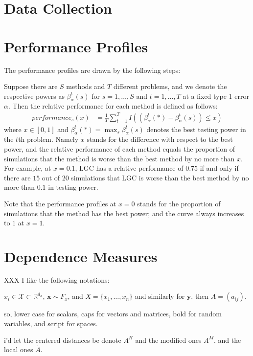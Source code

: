 \documentclass[11pt]{article}
\providecommand{\mt}[1]{\widetilde{#1}}
\providecommand{\mb}[1]{\boldsymbol{#1}}
\providecommand{\mc}[1]{\mathcal{#1}}
\newcommand{\Real}{\mathbb{R}}
\begin{document}
\section{Data Collection}



\section{Performance Profiles}

The performance profiles are drawn by the following steps:

Suppose there are $S$ methods and $T$ different problems, and we denote the respective powers as $\beta_{\alpha}^{t}(s)$ for $s=1,\ldots,S$ and $t=1,\ldots,T$ at a fixed type 1 error $\alpha$. Then the relative performance for each method is defined as follows:
\begin{align*}
performance_{s}(x) &= \frac{1}{T} \sum_{t=1}^{T} I((\beta_{\alpha}^{t}(*)-\beta_{\alpha}^{t}(s)) \leq x)
\end{align*}
where $x \in [0,1]$ and $\beta_{\alpha}^{t}(*) =\max_{s} \beta_{\alpha}^{t}(s)$ denotes the best testing power in the $t$th problem. Namely $x$ stands for the difference with respect to the best power, and the relative performance of each method equals the proportion of simulations that the method is worse than the best method by no more than $x$. For example, at $x=0.1$, LGC has a relative performance of $0.75$ if and only if there are $15$ out of $20$ simulations that LGC is worse than the best method by no more than $0.1$ in testing power. 

Note that the performance profiles at $x=0$ stands for the proportion of simulations that the method has the best power; and the curve always increases to $1$ at $x=1$. 

\section{Dependence Measures}
\label{main}

XXX I like the following notations:

$x_i \in \mc{X} \subset \Real^{d_x}$, $\mb{x} \sim F_x$, and $X=\{x_1,\ldots,x_n\}$ and similarly for $\mb{y}$. then $A=(a_{ij})$. 

so, lower case for scalars, caps for vectors and matrices, bold for random variables, and script for spaces.  

i'd let the centered distances be denote $A^H$ and the modified ones $A^M$.
and the local ones $\mt{A}$.
\end{document}
